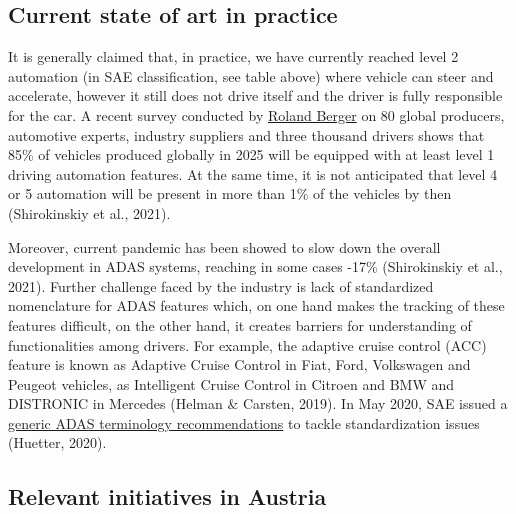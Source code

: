 \documentclass[
]{book}
\begin{document}
\hypertarget{current-state-of-art-in-practice-23}{%
\subsection*{Current state of art in practice}\label{current-state-of-art-in-practice-23}}

It is generally claimed that, in practice, we have currently reached level 2 automation (in SAE classification, see table above) where vehicle can steer and accelerate, however it still does not drive itself and the driver is fully responsible for the car. A recent survey conducted by \href{https://www.rolandberger.com/en/Insights/Publications/Advanced-Driver-Assistance-Systems-A-ubiquitous-technology-for-the-future-of.html}{Roland Berger} on 80 global producers, automotive experts, industry suppliers and three thousand drivers shows that 85\% of vehicles produced globally in 2025 will be equipped with at least level 1 driving automation features. At the same time, it is not anticipated that level 4 or 5 automation will be present in more than 1\% of the vehicles by then (Shirokinskiy et al., 2021).

Moreover, current pandemic has been showed to slow down the overall development in ADAS systems, reaching in some cases -17\% (Shirokinskiy et al., 2021). Further challenge faced by the industry is lack of standardized nomenclature for ADAS features which, on one hand makes the tracking of these features difficult, on the other hand, it creates barriers for understanding of functionalities among drivers. For example, the adaptive cruise control (ACC) feature is known as Adaptive Cruise Control in Fiat, Ford, Volkswagen and Peugeot vehicles, as Intelligent Cruise Control in Citroen and BMW and DISTRONIC in Mercedes (Helman \& Carsten, 2019). In May 2020, SAE issued a \href{https://www.repairerdrivennews.com/2020/05/15/sae-international-endorses-generic-adas-terminology-recommendations/}{generic ADAS terminology recommendations} to tackle standardization issues (Huetter, 2020).

\hypertarget{relevant-initiatives-in-austria-23}{%
\subsection*{Relevant initiatives in Austria}\label{relevant-initiatives-in-austria-23}}
\end{document}
